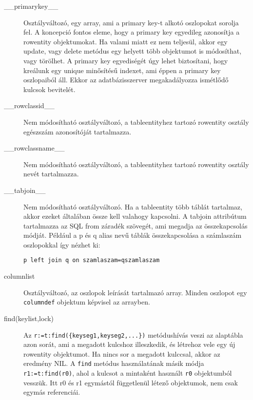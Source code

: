 \begin{description}

\item[\_\_primarykey\_\_]
    Osztályváltozó, egy array, ami a primary key-t alkotó
    oszlopokat sorolja fel. A koncepció fontos eleme, hogy a
    primary key egyedileg azonosítja a rowentity objektumokat.
    Ha valami miatt ez nem teljesül, akkor egy update, vagy
    delete metódus egy helyett több objektumot is módosíthat,
    vagy törölhet. A primary key egyediségét úgy lehet
    biztosítani, hogy kreálunk egy unique minősítésű indexet,
    ami éppen a primary key oszlopaiból áll. Ekkor az adatbázisszerver
    megakadályozza ismétlődő kulcsok bevitelét. 


\item[\_\_rowclassid\_\_]
    Nem módosítható osztályváltozó, a tableentityhez tartozó 
    rowentity osztály  egészszám azonosítóját tartalmazza.

\item[\_\_rowclassname\_\_]
    Nem módosítható osztályváltozó, a tableentityhez tartozó 
    rowentity osztály nevét tartalmazza.

\item[\_\_tabjoin\_\_]
    Nem módosítható osztályváltozó. Ha a tableentity több táblát
    tartalmaz, akkor ezeket általában össze kell valahogy kapcsolni.
    A tabjoin attribútum tartalmazza az SQL from záradék szövegét, 
    ami megadja az összekapcsolás módját. Például a p és q alias 
    nevű  táblák összekapcsolása a számlaszám oszlopokkal így
    nézhet ki:
\begin{verbatim}
p left join q on szamlaszam=qszamlaszam
\end{verbatim}

\item[columnlist]
    Osztályváltozó, az oszlopok leírását tartalmazó array.
    Minden oszlopot egy \verb!columndef! objektum képvisel  az arrayben.

\item[find(keylist,lock)]
    Az \verb!r:=t:find({keyseg1,keyseg2,...})! metódushívás
    veszi az alaptábla azon sorát, ami a megadott kulcshoz illeszkedik,
    és létrehoz vele egy új rowentity objektumot. Ha nincs sor
    a megadott kulccsal, akkor az eredmény NIL.
    A \verb!find! metódus használatának másik módja \verb!r1:=t:find(r0)!,
    ahol a kulcsot a mintaként használt \verb!r0! objektumból vesszük. 
    Itt r0 és r1 egymástól függetlenül létező objektumok, 
    nem csak egymás referenciái.


\end{description}
